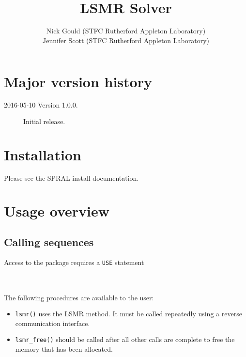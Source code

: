 \title{LSMR Solver}
\author{
   Nick Gould (STFC Rutherford Appleton Laboratory) \\
   Jennifer Scott (STFC Rutherford Appleton Laboratory)
}
\spralmaketitle
\thispagestyle{firststyle}

\newpage
\section*{Major version history}
\begin{description}
\item[2016-05-10 Version 1.0.0.] Initial release.
\end{description}


\section{Installation}
Please see the SPRAL install documentation. 


\section{Usage overview}

\subsection{Calling sequences}

Access to the package requires a {\tt USE} statement \\ \\
\indent\hspace{8mm}{\tt use spral\_lsmr} \\

\medskip

\noindent
The following procedures are available to the user:
\begin{itemize}
\item {\tt lsmr()} uses the LSMR method. It must be called repeatedly
using a reverse communication interface.
\item {\tt lsmr\_free()} should be called after all other calls are complete
to free the memory that has been allocated. 
\end{itemize}



